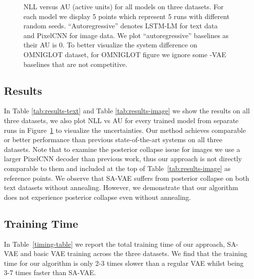 \documentclass{article} \usepackage{iclr2019_conference,times}
\begin{document}
\begin{figure}[!t]
\centering
    \vspace{-12pt}
\caption{NLL versus AU (active units) for all models on three datasets. For each model we display 5 points which represent 5 runs with different random seeds. ``Autoregressive'' denotes LSTM-LM for text data and PixelCNN for image data. We plot ``autoregressive'' baselines as their AU is 0. To better visualize the system difference on OMNIGLOT dataset, for OMNIGLOT figure we ignore some -VAE baselines that are not competitive.\label{fig:uncertain}}
\end{figure}

\subsection{Results}
In Table \ref{tab:results-text} and Table \ref{tab:results-image} we show the results on all three datasets, we also plot NLL vs AU for every trained model from separate runs in Figure~\ref{fig:uncertain} to visualize the uncertainties. Our method achieves comparable or better performance than previous state-of-the-art systems on all three datasets. Note that to examine the posterior collapse issue for images we use a larger PixelCNN decoder than previous work, thus our approach is not directly comparable to them and included at the top of Table~\ref{tab:results-image} as reference points. We observe that SA-VAE suffers from posterior collapse on both text datasets without annealing. However, we demonstrate that our algorithm does not experience posterior collapse even without annealing.







\subsection{Training Time}
In Table~\ref{timing-table} we report the total training time of our approach, SA-VAE and basic VAE training across the three datasets. We find that the training time for our algorithm is only 2-3 times slower than a regular VAE whilst being 3-7 times faster than SA-VAE. 
\end{document}
